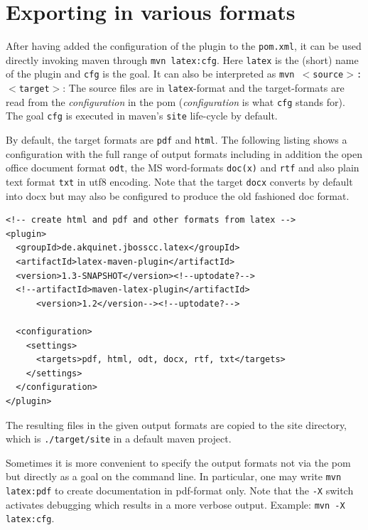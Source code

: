 \documentclass[12pt]{book}
\newcommand{\gls}[1]{#1}
\begin{document}
\section{Exporting in various formats}\label{chap:stableUsage}


After having added the configuration of the plugin to the \texttt{pom.xml}, 
it can be used directly invoking maven through 
\texttt{mvn latex:cfg}. 
Here \texttt{latex} is the (short) name of the plugin 
and \texttt{cfg} is the goal. 
It can also be interpreted as \texttt{mvn $<$source$>$:$<$target$>$}: 
The source files are in \texttt{latex}-format and the target-formats 
are read from the {\em configuration\/} in the pom 
({\em configuration\/} is what \texttt{cfg} stands for). 
The goal \texttt{cfg} 
is executed in maven's \texttt{site} life-cycle by default. 

By default, the target formats are \texttt{pdf} and \texttt{html}. 
The following listing shows a configuration 
with the full range of output formats including in addition 
the open office document format \texttt{odt}, 
the MS word-formats \texttt{doc(x)} and \texttt{rtf} %
and also plain text format \texttt{txt} in utf8 encoding. 
Note that the target \texttt{docx} converts by default into \gls{docx} 
but may also be configured to produce the old fashioned \gls{doc} format. 
%
\lstset{language=xml, basicstyle=\small}
\begin{lstlisting}
<!-- create html and pdf and other formats from latex -->
<plugin>
  <groupId>de.akquinet.jbosscc.latex</groupId>
  <artifactId>latex-maven-plugin</artifactId>
  <version>1.3-SNAPSHOT</version><!--uptodate?-->
  <!--artifactId>maven-latex-plugin</artifactId>
      <version>1.2</version--><!--uptodate?-->
	
  <configuration>
    <settings>
      <targets>pdf, html, odt, docx, rtf, txt</targets>
    </settings>
  </configuration>
</plugin>
\end{lstlisting}

The resulting files in the given output formats 
are copied to the site directory, 
which is \texttt{./target/site} in a default maven project. 

Sometimes it is more convenient 
to specify the output formats not via the pom 
but directly as a goal on the command line. 
In particular, one may write \texttt{mvn latex:pdf} to create documentation 
in pdf-format only. 
Note that the \texttt{-X} switch activates debugging 
which results in a more verbose output. 
Example: \texttt{mvn -X latex:cfg}. 
\end{document}
